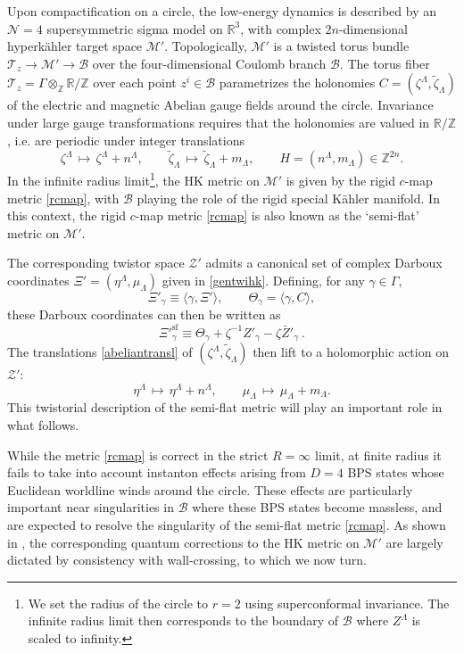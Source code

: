\documentclass[12pt,reqno]{article}
\numberwithin{equation}{section}
\newcommand{\be}{\begin{equation}}
\newcommand{\ee}{\end{equation}}
\def\bZ{\bar Z}
\newcommand{\cB}{\mathcal{B}}
\newcommand{\cM}{\mathcal{M}}
\newcommand{\cN}{\mathcal{N}}
\newcommand{\cT}{\mathcal{T}}
\newcommand{\cZ}{\mathcal{Z}}
\newcommand{\IR}{\mathbb{R}}
\newcommand{\kahler}{{K\"ahler}\xspace}
\newcommand{\hk}{{hyperk\"ahler}\xspace}
\def\varpihk{\zeta}
\def\pcM{\cM'}
\def\pcZ{\cZ'}
\def\pXi{\Xi'}
\numberwithin{equation}{section}
\begin{document}
Upon compactification on a circle, the low-energy dynamics is described
by an $\cN=4$ supersymmetric sigma model on $\IR^3$, with complex $2n$-dimensional
\hk target space $\pcM$. Topologically, $\pcM$ is a twisted torus bundle $\cT_z\rightarrow
\pcM\rightarrow \cB$ over the four-dimensional Coulomb branch $\cB$. The torus
fiber $\cT_z=\Gamma\otimes_{\mathbb{Z}}\mathbb{R}/\mathbb{Z}$
over each point $z^i\in \cB$ parametrizes the holonomies $C=(\zeta^{\Lambda}, \tilde\zeta_\Lambda)$ of
the electric and magnetic Abelian gauge fields around the circle. Invariance
under large gauge transformations requires that the holonomies are valued in
$\mathbb{R}/\mathbb{Z}$, i.e. are periodic under integer translations
\be
\zeta^{\Lambda} \, \mapsto \, \zeta^{\Lambda}+n^\Lambda,
\qquad
\tilde\zeta_\Lambda \, \mapsto \, \tilde\zeta_\Lambda +m_\Lambda,
\qquad
H=(n^{\Lambda}, m_\Lambda)\in \mathbb{Z}^{2n} .
\label{abeliantransl}
\ee
In the infinite radius limit\footnote{We set
the radius of the circle to $r=2$ using superconformal invariance. The infinite
radius limit then corresponds to the boundary of $\cB$ where $Z^\Lambda$ is scaled
to infinity.}, the HK metric on $\pcM$ is given by the rigid $c$-map metric \eqref{rcmap},
with $\cB$ playing the role of the rigid special \kahler manifold.
In this context, the  rigid $c$-map metric \eqref{rcmap} is also known as the
`semi-flat' metric on $\pcM$.

The corresponding twistor space
$\pcZ$ admits a canonical set of complex Darboux coordinates
$\pXi=(\eta^{\Lambda}, \mu_\Lambda)$ given in \eqref{gentwihk}. Defining, for any
$\gamma\in\Gamma$,
\be
\pXi_\gamma\equiv \langle \gamma,\pXi\rangle,
\qquad
\Theta_\gamma= \langle \gamma,C\rangle,
\ee
these Darboux coordinates can then be written as
\be
\pXi^{\text{sf}}_\gamma\equiv\Theta_\gamma +\varpihk^{-1}Z'_\gamma-\varpihk\bZ'_\gamma
\ .
\label{semiflatDarboux}
\ee
The translations \eqref{abeliantransl}
of $(\zeta^{\Lambda}, \tilde\zeta_\Lambda)$ then lift to a holomorphic action on $\pcZ$:
\be
\eta^{\Lambda}\, \mapsto\, \eta^{\Lambda}+n^{\Lambda},
\qquad
\mu_\Lambda \, \mapsto \, \mu_\Lambda +m_\Lambda.
\label{holabeliantranl}
\ee
This twistorial description of the semi-flat metric will play an important role in what follows.

While the metric \eqref{rcmap} is correct in the strict $R=\infty$ limit, at finite radius
it fails to take into account instanton effects arising from $D=4$ BPS states whose
Euclidean worldline  winds around the circle. These effects are particularly important
near singularities in $\cB$ where these BPS states become massless, and are expected
to resolve the singularity of the semi-flat metric \eqref{rcmap}. As shown in \cite{Gaiotto:2008cd},
the corresponding quantum corrections to the HK metric on $\pcM$
are largely dictated by consistency with wall-crossing, to which we now turn.
\end{document}
